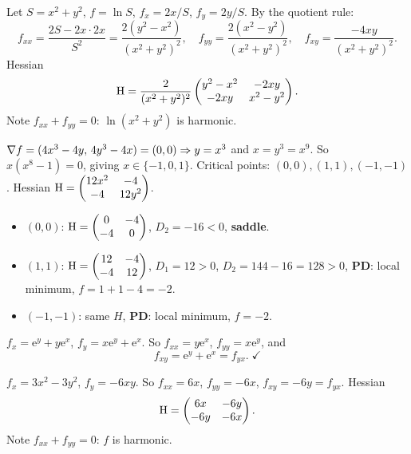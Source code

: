 \begin{solutions}
  \item Let $S=x^{2}+y^{2}$, $f=\ln S$, $f_x = 2x/S$, $f_y = 2y/S$. By the
        quotient rule:
        \[
          f_{xx} = \frac{2S-2x\cdot2x}{S^{2}} = \frac{2(y^{2}-x^{2})}{(x^{2}+y^{2})^{2}}, \quad
          f_{yy} = \frac{2(x^{2}-y^{2})}{(x^{2}+y^{2})^{2}}, \quad
          f_{xy} = \frac{-4xy}{(x^{2}+y^{2})^{2}} .
        \]
        Hessian
        \[
          \operatorname{H} = \frac{2}{(x^{2}+y^{2})^{2}}
          \begin{pmatrix}y^{2}-x^{2} & -2xy \\ -2xy & x^{2}-y^{2}\end{pmatrix} .
        \]
        Note $f_{xx}+f_{yy}=0$: $\ln(x^{2}+y^{2})$ is harmonic.

  \item $\nabla f = (4x^{3}-4y,\,4y^{3}-4x) = (0,0) \Rightarrow y=x^{3}$
        and $x=y^{3}=x^{9}$. So $x(x^{8}-1)=0$, giving $x\in\{-1,0,1\}$.
        Critical points: $(0,0),(1,1),(-1,-1)$. Hessian
        $\operatorname{H} = \begin{pmatrix}12x^{2}&-4\\-4&12y^{2}\end{pmatrix}$.
        \begin{itemize}
          \item $(0,0)$: $\operatorname{H} = \begin{pmatrix}0&-4\\-4&0\end{pmatrix}$,
                $D_2=-16<0$, \textbf{saddle}.
          \item $(1,1)$: $\operatorname{H} = \begin{pmatrix}12&-4\\-4&12\end{pmatrix}$,
                $D_1=12>0$, $D_2=144-16=128>0$, \textbf{PD}: local
                minimum, $f=1+1-4=-2$.
          \item $(-1,-1)$: same $H$, \textbf{PD}: local minimum, $f=-2$.
        \end{itemize}

  \item $f_x = \mathrm{e}^{y}+y\mathrm{e}^{x}$, $f_y = x\mathrm{e}^{y}+\mathrm{e}^{x}$. So
        $f_{xx} = y\mathrm{e}^{x}$, $f_{yy} = x\mathrm{e}^{y}$, and
        \[
          f_{xy} = \mathrm{e}^{y}+\mathrm{e}^{x} = f_{yx} . \; \checkmark
        \]

  \item $f_x = 3x^{2}-3y^{2}$, $f_y = -6xy$. So $f_{xx}=6x$,
        $f_{yy}=-6x$, $f_{xy}=-6y=f_{yx}$. Hessian
        \[
          \operatorname{H} = \begin{pmatrix}6x&-6y\\-6y&-6x\end{pmatrix} .
        \]
        Note $f_{xx}+f_{yy}=0$: $f$ is harmonic.


\end{solutions}
